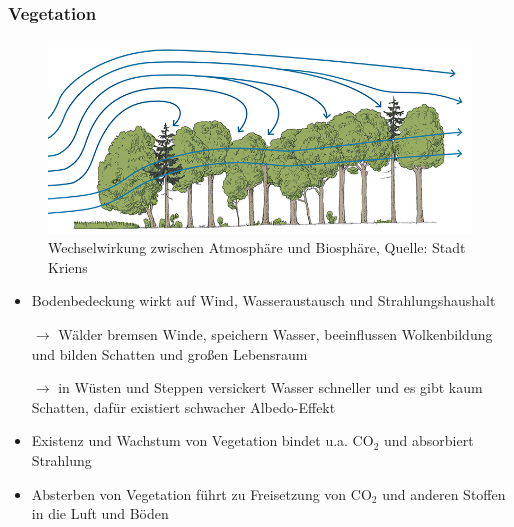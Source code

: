 \begin{frame}
	\frametitle{Vegetation}

  \begin{figure}
    \centering
    \includegraphics[width=.55\linewidth]{bilder/Wind_Vegetation.jpg}
    \caption{Wechselwirkung zwischen Atmosphäre und Biosphäre, Quelle: Stadt Kriens}
  \end{figure}
		\begin{itemize}
			\item Bodenbedeckung wirkt auf Wind, Wasseraustausch und Strahlungshaushalt
			\item [$\rightarrow$] Wälder bremsen Winde, speichern Wasser, beeinflussen Wolkenbildung und bilden Schatten und großen Lebensraum
			\item [$\rightarrow$] in Wüsten und Steppen versickert Wasser schneller und es gibt kaum Schatten, dafür existiert schwacher Albedo-Effekt
			\item Existenz und Wachstum von Vegetation bindet u.a. CO$_2$ und absorbiert Strahlung
			\item Absterben von Vegetation führt zu Freisetzung von CO$_2$ und anderen Stoffen in die Luft und Böden %
		\end{itemize}

\end{frame}
